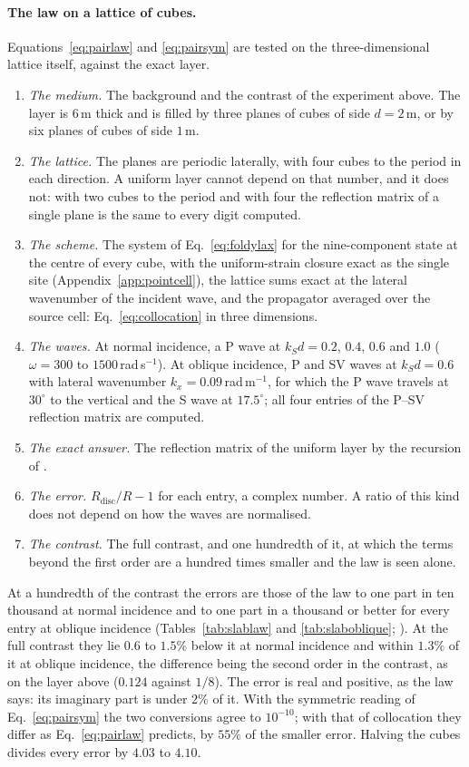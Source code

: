 \documentclass[11pt,a4paper]{article}
\begin{document}
\paragraph{The law on a lattice of cubes.} Equations~\eqref{eq:pairlaw} and \eqref{eq:pairsym} are tested
on the three-dimensional lattice itself, against the exact layer.
\begin{enumerate}
\item \emph{The medium.} The background and the contrast of the experiment above. The layer is $6$\,m
thick and is filled by three planes of cubes of side $d=2$\,m, or by six planes of cubes of side $1$\,m.
\item \emph{The lattice.} The planes are periodic laterally, with four cubes to the period in each
direction. A uniform layer cannot depend on that number, and it does not: with two cubes to the period
and with four the reflection matrix of a single plane is the same to every digit computed.
\item \emph{The scheme.} The system of Eq.~\eqref{eq:foldylax} for the nine-component state at the centre
of every cube, with the uniform-strain closure exact as the single site (Appendix~\ref{app:pointcell}),
the lattice sums exact at the lateral wavenumber of the incident wave, and the propagator averaged over
the source cell: Eq.~\eqref{eq:collocation} in three dimensions.
\item \emph{The waves.} At normal incidence, a P wave at $k_Sd=0.2$, $0.4$, $0.6$ and $1.0$
($\omega=300$ to $1500$\,rad\,s$^{-1}$). At oblique incidence, P and SV waves at $k_Sd=0.6$ with lateral
wavenumber $k_x=0.09$\,rad\,m$^{-1}$, for which the P wave travels at $30^\circ$ to the vertical and the S
wave at $17.5^\circ$; all four entries of the P--SV reflection matrix are computed.
\item \emph{The exact answer.} The reflection matrix of the uniform layer by the recursion of
\citet{Kennett1983}.
\item \emph{The error.} $R_{\text{disc}}/R-1$ for each entry, a complex number. A ratio of this kind does
not depend on how the waves are normalised.
\item \emph{The contrast.} The full contrast, and one hundredth of it, at which the terms beyond the
first order are a hundred times smaller and the law is seen alone.
\end{enumerate}
At a hundredth of the contrast the errors are those of the law to one part in ten thousand at normal
incidence and to one part in a thousand or better for every entry at oblique incidence (Tables~\ref{tab:slablaw} and \ref{tab:slaboblique};
). At the full contrast they lie $0.6$ to $1.5\%$ below it
at normal incidence and within $1.3\%$ of it at oblique incidence, the difference being the second order
in the contrast, as on the layer above ($0.124$ against $1/8$). The error is real and positive, as the law
says: its imaginary part is under $2\%$ of it. With the symmetric reading of
Eq.~\eqref{eq:pairsym} the two conversions agree to $10^{-10}$; with that of collocation they differ as
Eq.~\eqref{eq:pairlaw} predicts, by $55\%$ of the smaller error. Halving the cubes divides every error by
$4.03$ to $4.10$.
\end{document}
